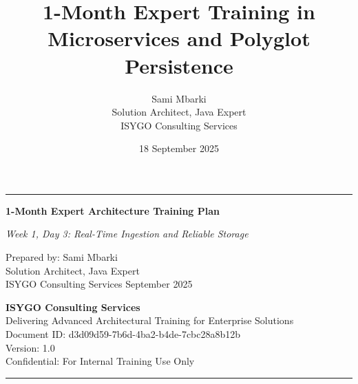 \documentclass[11pt]{article}
\begin{document}
\begin{titlepage}
    \centering
    \vspace*{1cm}
    \vspace{0.5cm}
    {\color{primaryblue}\hrule height 2pt}
    \vspace{0.5cm}
    {\LARGE\sffamily\bfseries 1-Month Expert Architecture Training Plan\par}
    \vspace{0.3cm}
    {\large\sffamily\itshape Week 1, Day 3: Real-Time Ingestion and Reliable Storage\par}
    \vspace{1.5cm}
    {\large\sffamily Prepared by: Sami Mbarki \\ Solution Architect, Java Expert \\ ISYGO Consulting Services}
    \vspace{1cm}
    {\large{} September 2025}
    \vfill
    \begin{minipage}{0.8\textwidth}
        \centering
        \small\sffamily \textbf{ISYGO Consulting Services} \\
        \small\sffamily Delivering Advanced Architectural Training for Enterprise Solutions \\
        \vspace{0.5cm}
        \small\sffamily Document ID: d3d09d59-7b6d-4ba2-b4de-7cbc28a8b12b \\
        \small\sffamily Version: 1.0 \\
        \small\sffamily Confidential: For Internal Training Use Only
    \end{minipage}
    {\color{primaryblue}\hrule height 2pt}
\end{titlepage}

\pretitle{\begin{center}\LARGE\sffamily\bfseries}
\posttitle{\end{center}}
\preauthor{\begin{center}\large\sffamily}
\postauthor{\end{center}}
\predate{\begin{center}\large\sffamily}
\postdate{\end{center}}

\pagestyle{fancy}
\title{1-Month Expert Training in Microservices and Polyglot Persistence}
\author{Sami Mbarki \\ Solution Architect, Java Expert \\ ISYGO Consulting Services}
\date{18 September 2025}
\maketitle
\end{document}
